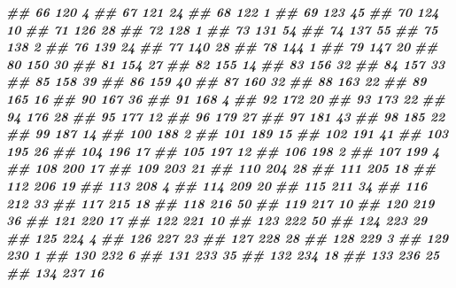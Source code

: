 \documentclass[
]{book}
\newenvironment{Shaded}{\begin{snugshade}}{\end{snugshade}}
\newcommand{\DocumentationTok}[1]{\textcolor[rgb]{0.56,0.35,0.01}{\textbf{\textit{#1}}}}
\theoremstyle{definition}
\theoremstyle{definition}
\theoremstyle{definition}
\theoremstyle{definition}
\theoremstyle{remark}
\begin{document}
\begin{Shaded}
\begin{Highlighting}[]
\DocumentationTok{\#\# 66     120  4}
\DocumentationTok{\#\# 67     121 24}
\DocumentationTok{\#\# 68     122  1}
\DocumentationTok{\#\# 69     123 45}
\DocumentationTok{\#\# 70     124 10}
\DocumentationTok{\#\# 71     126 28}
\DocumentationTok{\#\# 72     128  1}
\DocumentationTok{\#\# 73     131 54}
\DocumentationTok{\#\# 74     137 55}
\DocumentationTok{\#\# 75     138  2}
\DocumentationTok{\#\# 76     139 24}
\DocumentationTok{\#\# 77     140 28}
\DocumentationTok{\#\# 78     144  1}
\DocumentationTok{\#\# 79     147 20}
\DocumentationTok{\#\# 80     150 30}
\DocumentationTok{\#\# 81     154 27}
\DocumentationTok{\#\# 82     155 14}
\DocumentationTok{\#\# 83     156 32}
\DocumentationTok{\#\# 84     157 33}
\DocumentationTok{\#\# 85     158 39}
\DocumentationTok{\#\# 86     159 40}
\DocumentationTok{\#\# 87     160 32}
\DocumentationTok{\#\# 88     163 22}
\DocumentationTok{\#\# 89     165 16}
\DocumentationTok{\#\# 90     167 36}
\DocumentationTok{\#\# 91     168  4}
\DocumentationTok{\#\# 92     172 20}
\DocumentationTok{\#\# 93     173 22}
\DocumentationTok{\#\# 94     176 28}
\DocumentationTok{\#\# 95     177 12}
\DocumentationTok{\#\# 96     179 27}
\DocumentationTok{\#\# 97     181 43}
\DocumentationTok{\#\# 98     185 22}
\DocumentationTok{\#\# 99     187 14}
\DocumentationTok{\#\# 100    188  2}
\DocumentationTok{\#\# 101    189 15}
\DocumentationTok{\#\# 102    191 41}
\DocumentationTok{\#\# 103    195 26}
\DocumentationTok{\#\# 104    196 17}
\DocumentationTok{\#\# 105    197 12}
\DocumentationTok{\#\# 106    198  2}
\DocumentationTok{\#\# 107    199  4}
\DocumentationTok{\#\# 108    200 17}
\DocumentationTok{\#\# 109    203 21}
\DocumentationTok{\#\# 110    204 28}
\DocumentationTok{\#\# 111    205 18}
\DocumentationTok{\#\# 112    206 19}
\DocumentationTok{\#\# 113    208  4}
\DocumentationTok{\#\# 114    209 20}
\DocumentationTok{\#\# 115    211 34}
\DocumentationTok{\#\# 116    212 33}
\DocumentationTok{\#\# 117    215 18}
\DocumentationTok{\#\# 118    216 50}
\DocumentationTok{\#\# 119    217 10}
\DocumentationTok{\#\# 120    219 36}
\DocumentationTok{\#\# 121    220 17}
\DocumentationTok{\#\# 122    221 10}
\DocumentationTok{\#\# 123    222 50}
\DocumentationTok{\#\# 124    223 29}
\DocumentationTok{\#\# 125    224  4}
\DocumentationTok{\#\# 126    227 23}
\DocumentationTok{\#\# 127    228 28}
\DocumentationTok{\#\# 128    229  3}
\DocumentationTok{\#\# 129    230  1}
\DocumentationTok{\#\# 130    232  6}
\DocumentationTok{\#\# 131    233 35}
\DocumentationTok{\#\# 132    234 18}
\DocumentationTok{\#\# 133    236 25}
\DocumentationTok{\#\# 134    237 16}

\end{Highlighting}
\end{Shaded}
\end{document}
